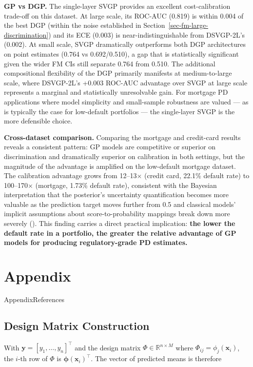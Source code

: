\documentclass[
  letterpaper,
  DIV=11,
  numbers=noendperiod]{scrartcl}
\makeatletter
\let\@orig@addcontentsline\addcontentsline
\renewcommand{\addcontentsline}[3]{%
    \def\@acltmp{#3}\def\@aclref{References}%
    \ifx\@acltmp\@aclref\else\@orig@addcontentsline{#1}{#2}{#3}\fi
  }%
\makeatother
\begin{document}
\textbf{GP vs DGP.} The single-layer SVGP provides an excellent
cost-calibration trade-off on this dataset. At large scale, its ROC-AUC
(0.819) is within 0.004 of the best DGP (within the noise established in
Section~\ref{sec-fm-large-discrimination}) and its ECE (0.003) is
near-indistinguishable from DSVGP-2L's (0.002). At small scale, SVGP
dramatically outperforms both DGP architectures on point estimates
(0.764 vs 0.692/0.510), a gap that is statistically significant given
the wider FM CIs still separate 0.764 from 0.510. The additional
compositional flexibility of the DGP primarily manifests at
medium-to-large scale, where DSVGP-2L's +0.003 ROC-AUC advantage over
SVGP at large scale represents a marginal and statistically unresolvable
gain. For mortgage PD applications where model simplicity and
small-sample robustness are valued --- as is typically the case for
low-default portfolios --- the single-layer SVGP is the more defensible
choice.

\textbf{Cross-dataset comparison.} Comparing the mortgage and
credit-card results reveals a consistent pattern: GP models are
competitive or superior on discrimination and dramatically superior on
calibration in both settings, but the magnitude of the advantage is
amplified on the low-default mortgage dataset. The calibration advantage
grows from 12--13\(\times\) (credit card, 22.1\% default rate) to
100--170\(\times\) (mortgage, 1.73\% default rate), consistent with the
Bayesian interpretation that the posterior's uncertainty quantification
becomes more valuable as the prediction target moves further from 0.5
and classical models' implicit assumptions about score-to-probability
mappings break down more severely
(). This finding carries a direct practical implication:
\textbf{the lower the default rate in a portfolio, the greater the
relative advantage of GP models for producing regulatory-grade PD
estimates.}

\section*{Appendix}\label{appendix}

\subsection{Design Matrix Construction}\label{sec-design-matrix}

With \(\mathbf{y} = [y_1, \ldots, y_n]^\top\) and the design matrix
\(\Phi \in \mathbb{R}^{n \times M}\) where
\(\Phi_{ij} = \phi_j(\mathbf{x}_i)\), the \(i\)-th row of \(\Phi\) is
\(\boldsymbol{\phi}(\mathbf{x}_i)^\top\). The vector of predicted means
is therefore
\end{document}
